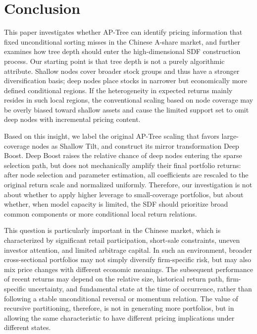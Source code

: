 \documentclass[12pt]{article}
\begin{document}
\clearpage

\section{Conclusion}
\label{sec:conclusion}

This paper investigates whether AP-Tree can identify pricing information that fixed unconditional sorting misses in the Chinese A-share market, and further examines how tree depth should enter the high-dimensional SDF construction process. Our starting point is that tree depth is not a purely algorithmic attribute. Shallow nodes cover broader stock groups and thus have a stronger diversification basis; deep nodes place stocks in narrower but economically more defined conditional regions. If the heterogeneity in expected returns mainly resides in such local regions, the conventional scaling based on node coverage may be overly biased toward shallow assets and cause the limited support set to omit deep nodes with incremental pricing content.

Based on this insight, we label the original AP-Tree scaling that favors large-coverage nodes as Shallow Tilt, and construct its mirror transformation Deep Boost. Deep Boost raises the relative chance of deep nodes entering the sparse selection path, but does not mechanically amplify their final portfolio returns: after node selection and parameter estimation, all coefficients are rescaled to the original return scale and normalized uniformly. Therefore, our investigation is not about whether to apply higher leverage to small-coverage portfolios, but about whether, when model capacity is limited, the SDF should prioritize broad common components or more conditional local return relations.

This question is particularly important in the Chinese market, which is characterized by significant retail participation, short-sale constraints, uneven investor attention, and limited arbitrage capital. In such an environment, broader cross-sectional portfolios may not simply diversify firm-specific risk, but may also mix price changes with different economic meanings. The subsequent performance of recent returns may depend on the relative size, historical return path, firm-specific uncertainty, and fundamental state at the time of occurrence, rather than following a stable unconditional reversal or momentum relation. The value of recursive partitioning, therefore, is not in generating more portfolios, but in allowing the same characteristic to have different pricing implications under different states.
\end{document}

